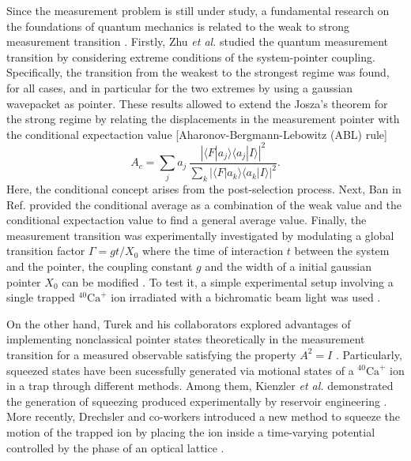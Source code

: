\documentclass[aps,pra,preprint,superscriptaddress, showpacs]{revtex4-2}
\begin{document}
Since the measurement problem is still under study, a fundamental research on the foundations of quantum mechanics is related to the weak to strong measurement transition \cite{ferraioli2019measurement,gyongyosi2019dense}. Firstly, Zhu \textit{et al.} \cite{zhu2011quantum} studied the quantum measurement transition by considering extreme conditions of the system-pointer coupling. Specifically, the transition from the weakest to the strongest regime was found, for all cases, and in particular for the two extremes by using a gaussian wavepacket as pointer. These results allowed to extend the Josza's theorem for the strong regime by relating the displacements in the measurement pointer with the conditional expectaction value [Aharonov-Bergmann-Lebowitz (ABL) rule] \cite{aharonov1964time, aharonov2008two}
\begin{equation}\label{conditional.value}
A_{c}=\sum_{j} a_{j}\,\frac{\left|\langle F|a_{j} \rangle\langle a_{j}|I \rangle\right|^2}{\sum_{k}\left|\langle F|a_{k} \rangle\langle a_{k}|I \rangle\right|^2}.
\end{equation}
Here, the conditional concept arises from the post-selection process. Next, Ban in Ref. \cite{ban2015conditional} provided the conditional average as a combination of the weak value and the conditional expectaction value to find a general average value. Finally, the measurement transition was experimentally investigated by modulating a global transition factor $\Gamma=gt/X_{0}$ where the time of interaction $t$ between the system and the pointer, the coupling constant $g$ and the width of a initial gaussian pointer $X_{0}$ can be modified \cite{pan2020weak}. To test it, a simple experimental setup involving a single trapped ${}^{40}\text{Ca}^{+}$ ion irradiated with a bichromatic beam light was used \cite{wu2019scheme}. 

On the other hand, Turek and his collaborators explored advantages of implementing nonclassical pointer states theoretically in the measurement transition for a measured observable satisfying the property $A^2=I$ \cite{turek2015advantages}. Particularly, squeezed states have been sucessfully generated via motional states of a ${}^{40}\text{Ca}^{+}$ ion in a trap through different methods. Among them, Kienzler \textit{et al.} demonstrated the generation of squeezing produced experimentally by reservoir engineering \cite{kienzler2015quantum}. More recently, Drechsler and co-workers introduced a new method to squeeze the motion of the trapped ion by placing the ion inside a time-varying potential controlled by the phase of an optical lattice \cite{drechsler2020state}. 
 
\end{document}
